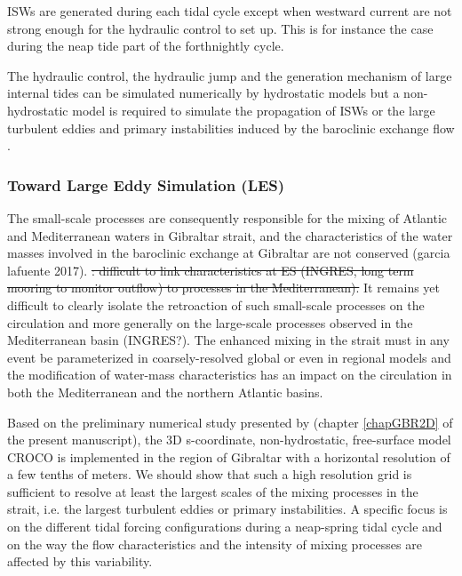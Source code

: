 ISWs are generated during each tidal cycle except when westward current are not strong enough for the hydraulic control to set up. This is for instance the case during the neap tide part of the forthnightly cycle\citep{watson_1990,garcialafuente_2000}. 

The hydraulic control, the hydraulic jump and the generation mechanism of large internal tides can be simulated numerically by hydrostatic models but a non-hydrostatic model is required to simulate the propagation of ISWs or the large turbulent eddies and primary instabilities induced by the baroclinic exchange flow \citep{brandt_1996,vlasenko_2009}.



\subsubsection{Toward Large Eddy Simulation (LES)}

The small-scale processes are consequently responsible for the mixing of Atlantic and Mediterranean waters in Gibraltar strait, and the characteristics of the water masses involved in the baroclinic exchange at Gibraltar are not conserved (garcia lafuente 2017). \color{blue} \sout{: difficult to link characteristics at ES (INGRES, long term mooring to monitor outflow) to processes in the Mediterranean).} It remains yet difficult to clearly isolate the retroaction of such small-scale processes on the circulation and more generally on the large-scale processes observed in the Mediterranean basin  (INGRES?). \color{black}
The enhanced mixing in the strait must in any event be \color{black}parameterized in coarsely-resolved global or even in regional models and the modification of water-mass characteristics \color{black} has an impact on the circulation in both the Mediterranean and the northern Atlantic basins. 

Based on the preliminary numerical study presented by \citet{hilt_2020} \color{blue}(chapter \ref{chapGBR2D} of the present manuscript), the 3D s-coordinate, non-hydrostatic, free-surface model CROCO is implemented in the region of Gibraltar with a horizontal resolution of a few tenths of meters. We should show that such a high resolution grid is sufficient to resolve at least the largest scales of the mixing processes in the strait, i.e. the largest turbulent eddies or primary instabilities. A specific focus is on the \color{black} different tidal forcing configurations during a neap-spring tidal cycle \color{blue} and on the way the flow characteristics and the intensity of mixing processes are affected by this variability. \color{black}

